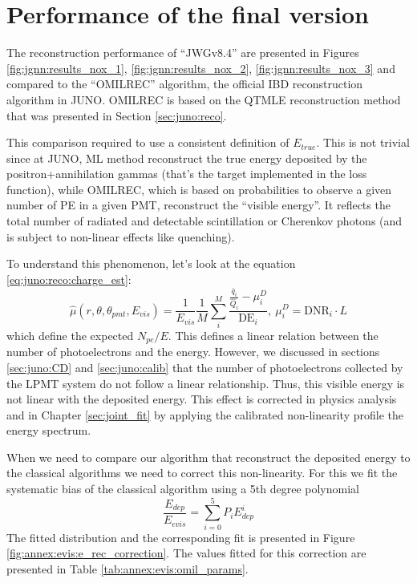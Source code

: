 \documentclass[../main.tex]{subfiles}
\begin{document}
\section{Performance of the final version}
\label{sec:jgnn:results}


The reconstruction performance of ``JWGv8.4'' are presented in Figures \ref{fig:jgnn:results_nox_1}, \ref{fig:jgnn:results_nox_2}, \ref{fig:jgnn:results_nox_3} and compared to the ``OMILREC'' algorithm, the official IBD reconstruction algorithm in JUNO. OMILREC is based on the QTMLE reconstruction method that was presented in Section \ref{sec:juno:reco}.

This comparison required to use a consistent definition of $E_{true}$. This is not trivial since at JUNO, ML method reconstruct the true energy deposited by the positron+annihilation gammas (that's the target implemented in the loss function), while OMILREC, which is based on probabilities to observe a given number of PE in a given PMT, reconstruct the ``visible energy''. It reflects the total number of radiated and detectable scintillation or Cherenkov photons (and is subject to non-linear effects like quenching).

To understand this phenomenon, let's look at the equation \ref{eq:juno:reco:charge_est}:
\begin{equation*}
  \hat{\mu}(r, \theta, \theta_{pmt}, E_{vis}) = \frac{1}{E_{vis}} \frac{1}{M} \sum_i^M\frac{\frac{\bar{q}_i}{\hat{Q}_i} - \mu_i^D}{\mathrm{DE}_i}, ~ \mu_i^D = \mathrm{DNR}_i \cdot L
\end{equation*}
which define the expected $N_{pe}/E$. This defines a linear relation between the number of photoelectrons and the energy. However, we discussed in sections \ref{sec:juno:CD} and \ref{sec:juno:calib} that the number of photoelectrons collected by the LPMT system do not follow a linear relationship. Thus, this visible energy is not linear with the deposited energy. This effect is corrected in physics analysis and in Chapter \ref{sec:joint_fit} by applying the calibrated non-linearity profile the energy spectrum.

When we need to compare our algorithm that reconstruct the deposited energy to the classical algorithms we need to correct this non-linearity. For this we fit the systematic bias of the classical algorithm using a 5th degree polynomial
\begin{equation}
  \frac{E_{dep}}{E_{evis}} = \sum_{i=0}^5 P_i E_{dep}^i
\end{equation}
The fitted distribution and the corresponding fit is presented in Figure \ref{fig:annex:evis:e_rec_correction}. The values fitted for this correction are presented in Table \ref{tab:annex:evis:omil_params}.
\end{document}
